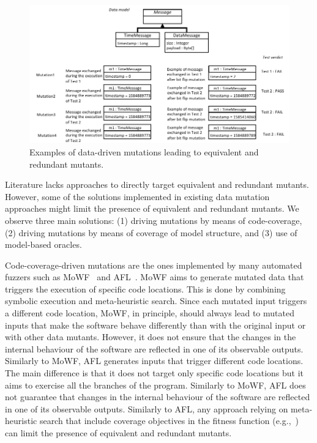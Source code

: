 \begin{figure}[h]
  \centering
    \includegraphics{images/DataDrivenEquivalent}
      \caption{Examples of data-driven mutations leading to equivalent and redundant mutants.}
      \label{fig:data:quivalent}
\end{figure}

Literature lacks approaches to directly target equivalent and redundant mutants. However, some of the solutions implemented in existing data mutation approaches might limit the presence of equivalent and redundant mutants. We observe three main solutions: (1) driving mutations by means of code-coverage, (2) driving mutations by means of coverage of model structure, and (3) use of model-based oracles.

Code-coverage-driven mutations are the ones implemented by many automated fuzzers such as 
MoWF~\cite{pham2016model} and AFL~\cite{gutmann2016fuzzing}.
MoWF aims to generate mutated data that triggers the execution of specific code locations. This is done by combining symbolic execution and meta-heuristic search.
Since each mutated input triggers a different code location, MoWF, in principle, should always lead to mutated inputs that make the software behave differently than with the original input or with other data mutants. However, it does not ensure that the changes in the internal behaviour of the software are reflected in one of its observable outputs.
Similarly to MoWF, AFL generates inputs that trigger different code locations. The main difference is that it does not target only specific code locations but it aims to exercise all the branches of the program. 
Similarly to MoWF, AFL does not guarantee that changes in the internal behaviour of the software are reflected in one of its observable outputs.
Similarly to AFL, any approach relying on meta-heuristic search that include coverage objectives in the fitness function (e.g.,~\cite{di2015evolutionary}) can limit the presence of equivalent and redundant mutants.


